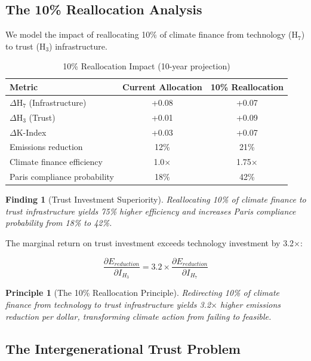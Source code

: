 \documentclass[12pt,a4paper]{article}
\newtheorem{finding}{Finding}
\newtheorem{principle}{Principle}
\begin{document}
\subsection{The 10\% Reallocation Analysis}

We model the impact of reallocating 10\% of climate finance from technology (H$_7$) to trust (H$_3$) infrastructure.

\begin{table}[H]
\centering
\caption{10\% Reallocation Impact (10-year projection)}
\label{tab:reallocation}
\begin{tabular}{lcc}
\toprule
\textbf{Metric} & \textbf{Current Allocation} & \textbf{10\% Reallocation} \\
\midrule
$\Delta$H$_7$ (Infrastructure) & +0.08 & +0.07 \\
$\Delta$H$_3$ (Trust) & +0.01 & +0.09 \\
$\Delta$K-Index & +0.03 & +0.07 \\
Emissions reduction & 12\% & 21\% \\
Climate finance efficiency & 1.0$\times$ & 1.75$\times$ \\
Paris compliance probability & 18\% & 42\% \\
\bottomrule
\end{tabular}
\end{table}

\begin{finding}[Trust Investment Superiority]
Reallocating 10\% of climate finance to trust infrastructure yields 75\% higher efficiency and increases Paris compliance probability from 18\% to 42\%.
\end{finding}

The marginal return on trust investment exceeds technology investment by 3.2$\times$:

\begin{equation}
\frac{\partial E_{reduction}}{\partial I_{H_3}} = 3.2 \times \frac{\partial E_{reduction}}{\partial I_{H_7}}
\end{equation}

\begin{principle}[The 10\% Reallocation Principle]
Redirecting 10\% of climate finance from technology to trust infrastructure yields 3.2$\times$ higher emissions reduction per dollar, transforming climate action from failing to feasible.
\end{principle}

\subsection{The Intergenerational Trust Problem}
\end{document}

